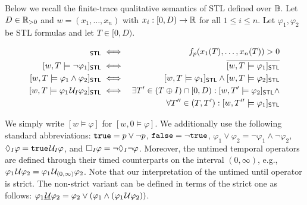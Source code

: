 Below we recall the finite-trace qualitative semantics of STL defined over $\mathbb{B}$.
Let $D \in \mathbb{R}_{> 0}$ and $w = (x_1, \ldots, x_n)$ with $x_i : [0,D) \to \mathbb{R}$ for all $1 \leq i \leq n$.
Let $\varphi_1, \varphi_2$ be STL formulas and let $T \in [0,D)$.

\small
\begin{align*}
	[w,T \models p]_{\mathsf{STL}} &\iff & f_p(x_1(T), \ldots, x_n(T)) > 0 \\
	[w,T \models \lnot \varphi_1]_{\mathsf{STL}} &\iff & \overline{[w,T \models \varphi_1]_{\mathsf{STL}}} \\
	[w,T \models \varphi_1 \land \varphi_2]_{\mathsf{STL}} &\iff & [w,T \models \varphi_1]_{\mathsf{STL}} \land [w,T \models \varphi_2]_{\mathsf{STL}} \\
	[w,T \models \varphi_1 \until_I \varphi_2]_{\mathsf{STL}} &\iff & \exists T' \in (T \oplus I) \cap [0,D) : [w,T' \models \varphi_2]_{\mathsf{STL}} \land \\
	& & \forall T'' \in (T, T') : [w,T'' \models \varphi_1]_{\mathsf{STL}} \\
\end{align*}
\normalsize

We simply write $[w \models \varphi]$ for $[w,0 \models \varphi]$.
We additionally use the following standard abbreviations: 
$\texttt{true} = p \lor \lnot p$,
$\texttt{false} = \lnot \texttt{true}$,
$ \varphi_1 \lor \varphi_2 = \lnot \varphi_1 \land \lnot \varphi_2$,
$\lozenge_I \varphi = \texttt{true} \kern.1em\mathcal{U}_I \varphi$, and
$\square_I \varphi = \lnot \lozenge_I \lnot \varphi$.
Moreover, the untimed temporal operators are defined through their timed counterparts on the interval $(0,\infty)$, e.g., $\varphi_1 \kern.1em\mathcal{U} \varphi_2 = \varphi_1 \kern.1em\mathcal{U}_{(0,\infty)} \varphi_2$.
Note that our interpretation of the untimed until operator is strict.
The non-strict variant can be defined in terms of the strict one as follows: $\varphi_1 \underline{\kern.1em\mathcal{U}} \varphi_2 = \varphi_2 \lor (\varphi_1 \land (\varphi_1 \kern.1em\mathcal{U} \varphi_2))$.

